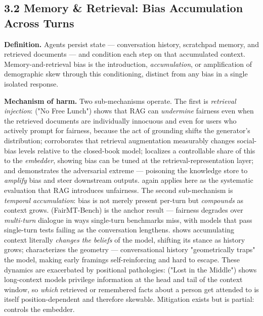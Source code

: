 \documentclass[sigconf,nonacm]{acmart}
\begin{document}
\subsection{3.2 Memory & Retrieval: Bias Accumulation Across Turns}

\textbf{Definition.} Agents persist state — conversation history, scratchpad memory, and retrieved documents — and condition each step on that accumulated context. Memory-and-retrieval bias is the introduction, \emph{accumulation}, or amplification of demographic skew through this conditioning, distinct from any bias in a single isolated response.

\textbf{Mechanism of harm.} Two sub-mechanisms operate. The first is \emph{retrieval injection}: \cite{hu2024free} ("No Free Lunch") shows that RAG can \emph{undermine} fairness even when the retrieved documents are individually innocuous and even for users who actively prompt for fairness, because the act of grounding shifts the generator's distribution; \cite{zhang2025evaluating} corroborates that retrieval augmentation measurably changes social-bias levels relative to the closed-book model; \cite{kim2025mitigating} localizes a controllable share of this to the \emph{embedder}, showing bias can be tuned at the retrieval-representation layer; and \cite{wang2025bias} demonstrates the adversarial extreme — poisoning the knowledge store to \emph{amplify} bias and steer downstream outputs. \cite{wu2024rag} again applies here as the systematic evaluation that RAG introduces unfairness. The second sub-mechanism is \emph{temporal accumulation}: bias is not merely present per-turn but \emph{compounds} as context grows. \cite{fan2024fairmt} (FairMT-Bench) is the anchor result — fairness degrades over \emph{multi-turn} dialogue in ways single-turn benchmarks miss, with models that pass single-turn tests failing as the conversation lengthens. \cite{geng2025accumulating} shows accumulating context literally \emph{changes the beliefs} of the model, shifting its stance as history grows; \cite{simhi2026old} characterizes the geometry — conversational history "geometrically traps" the model, making early framings self-reinforcing and hard to escape. These dynamics are exacerbated by positional pathologies: \cite{liu2023lost} ("Lost in the Middle") shows long-context models privilege information at the head and tail of the context window, so \emph{which} retrieved or remembered facts about a person get attended to is itself position-dependent and therefore skewable. Mitigation exists but is partial: \cite{kim2025mitigating} controls the embedder.
\end{document}
